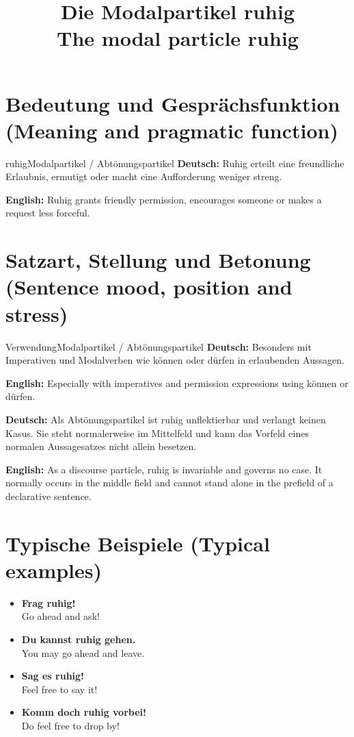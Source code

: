 \documentclass[a4paper,11pt]{article}
\title{Die Modalpartikel \glqq ruhig\grqq\\{\large\textnormal{The modal particle ruhig}}}
\date{}
\newcommand{\GermanText}[1]{\textbf{Deutsch: }#1\par}
\newcommand{\EnglishText}[1]{{\small\color{SoftGray}\textbf{English: }#1\par}}
\newcommand{\ExampleItem}[2]{\item \textbf{#1}\\{\small\color{SoftGray}#2}}
\begin{document}
\maketitle
\tableofcontents
\section{Bedeutung und Gesprächsfunktion \textnormal{(Meaning and pragmatic function)}}
\begin{grammarentry}{ruhig}{Modalpartikel / Abtönungspartikel}
\GermanText{Ruhig erteilt eine freundliche Erlaubnis, ermutigt oder macht eine Aufforderung weniger streng.}
\EnglishText{Ruhig grants friendly permission, encourages someone or makes a request less forceful.}
\end{grammarentry}
\section{Satzart, Stellung und Betonung \textnormal{(Sentence mood, position and stress)}}
\begin{grammarentry}{Verwendung}{Modalpartikel / Abtönungspartikel}
\GermanText{Besonders mit Imperativen und Modalverben wie können oder dürfen in erlaubenden Aussagen.}
\EnglishText{Especially with imperatives and permission expressions using können or dürfen.}
\end{grammarentry}
\GermanText{Als Abtönungspartikel ist ruhig unflektierbar und verlangt keinen Kasus. Sie steht normalerweise im Mittelfeld und kann das Vorfeld eines normalen Aussagesatzes nicht allein besetzen.}
\EnglishText{As a discourse particle, ruhig is invariable and governs no case. It normally occurs in the middle field and cannot stand alone in the prefield of a declarative sentence.}
\section{Typische Beispiele \textnormal{(Typical examples)}}
\begin{exbox}\begin{itemize}
\ExampleItem{Frag ruhig!}{Go ahead and ask!}
\ExampleItem{Du kannst ruhig gehen.}{You may go ahead and leave.}
\ExampleItem{Sag es ruhig!}{Feel free to say it!}
\ExampleItem{Komm doch ruhig vorbei!}{Do feel free to drop by!}
\end{itemize}\end{exbox}
\end{document}
